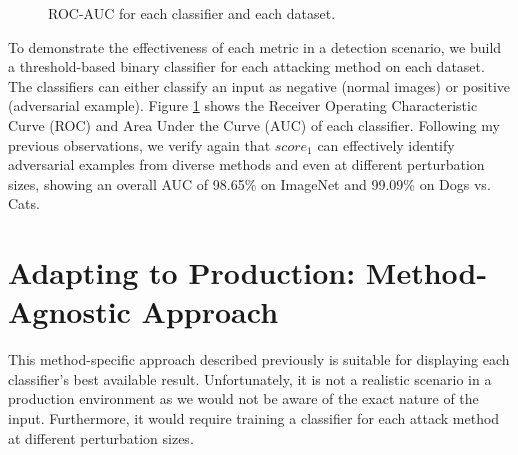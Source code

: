 \begin{figure}[htp]
    \caption{ROC-AUC for each classifier and each dataset.}
    \label{fig:rocs}
\end{figure}

To demonstrate the effectiveness of each metric in a detection scenario, we
build a threshold-based binary classifier for each attacking method on each
dataset. The classifiers can either classify an input as negative (normal
images) or positive (adversarial example). Figure \ref{fig:rocs} shows the
Receiver Operating Characteristic Curve (ROC) and Area Under the Curve (AUC) of
each classifier. Following my previous observations, we verify again that
$score_1$ can effectively identify adversarial examples from diverse methods and
even at different perturbation sizes, showing an overall AUC of 98.65\% on
ImageNet and 99.09\% on Dogs vs. Cats.

\section{Adapting to Production: Method-Agnostic Approach}
This method-specific approach described previously is suitable for displaying
each classifier's best available result. Unfortunately, it is not a realistic
scenario in a production environment as we would not be aware of the exact
nature of the input. Furthermore, it would require training a classifier for
each attack method at different perturbation sizes.

